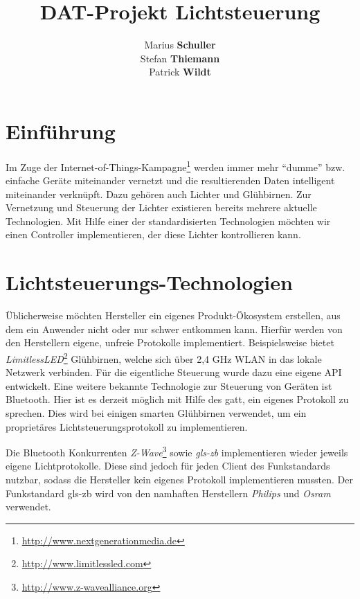\documentclass[a4paper,12pt]{article}
\begin{document}
\title{DAT-Projekt Lichtsteuerung}
\author{Marius \textbf{Schuller}\\
        Stefan \textbf{Thiemann}\\
		Patrick \textbf{Wildt}}
\maketitle

\newpage

\tableofcontents

\onehalfspacing

\newpage

\section{Einführung}
\label{einfuehrung}

Im Zuge der
Internet-of-Things-Kampagne\footnote{\url{http://www.nextgenerationmedia.de}}
werden immer mehr ``dumme'' bzw. einfache Geräte miteinander vernetzt und die
resultierenden Daten intelligent miteinander verknüpft. Dazu gehören auch
Lichter und Glühbirnen. Zur Vernetzung und Steuerung der Lichter existieren
bereits mehrere aktuelle Technologien. Mit Hilfe einer der standardisierten
Technologien möchten wir einen Controller implementieren, der diese Lichter
kontrollieren kann.

\section{Lichtsteuerungs-Technologien}
\label{technology}

Üblicherweise möchten Hersteller ein eigenes Produkt-Ökosystem erstellen, aus
dem ein Anwender nicht oder nur schwer entkommen kann. Hierfür werden von den
Herstellern eigene, unfreie Protokolle implementiert. Beispielsweise bietet
\textit{LimitlessLED}\footnote{\url{http://www.limitlessled.com}} Glühbirnen,
welche sich über 2,4 GHz WLAN in das lokale Netzwerk verbinden. Für die
eigentliche Steuerung wurde dazu eine eigene API entwickelt. Eine weitere
bekannte Technologie zur Steuerung von Geräten ist Bluetooth. Hier ist es
derzeit möglich mit Hilfe des \gls{gatt}, ein eigenes Protokoll zu sprechen.
Dies wird bei einigen smarten Glühbirnen verwendet, um ein proprietäres
Lichtsteuerungsprotokoll zu implementieren.

Die Bluetooth Konkurrenten
\textit{Z-Wave}\footnote{\url{http://www.z-wavealliance.org}} sowie
\textit{\gls{gls-zb}} implementieren wieder jeweils eigene Lichtprotokolle.
Diese sind jedoch für jeden Client des Funkstandards nutzbar, sodass die
Hersteller kein eigenes Protokoll implementieren mussten. Der Funkstandard
\gls{gls-zb} wird von den namhaften Herstellern \textit{Philips} und
\textit{Osram} verwendet.
\end{document}
